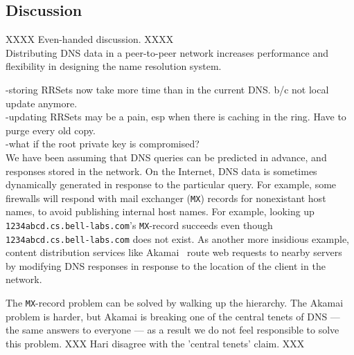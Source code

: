 \subsection{Discussion}
\label{sec:discuss}

XXXX Even-handed discussion. XXXX\\

Distributing DNS data in a peer-to-peer network 
increases performance and flexibility 
in designing the name resolution system. 

-storing RRSets now take more time than in the current
DNS. b/c not local update anymore.\\
-updating RRSets may be a pain, esp when there is 
caching in the ring. Have to purge every old copy.\\
-what if the root private key is compromised?\\

We have been assuming that DNS queries can be predicted in advance,
and responses stored in the network.
On the Internet, DNS data is sometimes dynamically generated in response
to the particular query.  
For example, some firewalls will respond with mail exchanger ({\tt MX}) records
for nonexistant host names, to avoid publishing internal host names.
For example, looking up {\tt 1234abcd.cs.bell-labs.com}'s {\tt MX}-record
succeeds even though {\tt 1234abcd.cs.bell-labs.com} does not exist.
As another more insidious example, content distribution services like 
Akamai~\cite{akamai}
route web requests to nearby servers by modifying DNS responses in response
to the location of the client in the network.

The {\tt MX}-record problem can be solved by walking up the hierarchy.
The Akamai problem is harder, but Akamai is breaking one of the 
central tenets of DNS --- the same answers to everyone --- as a
result we do not feel responsible to solve this problem. 
XXX Hari disagree with the 'central tenets' claim. XXX

